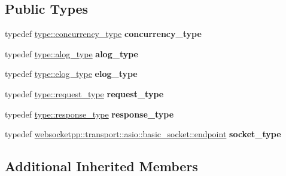 \subsection*{Public Types}
\begin{DoxyCompactItemize}
\item 
typedef \hyperlink{classwebsocketpp_1_1concurrency_1_1none}{type\+::concurrency\+\_\+type} {\bfseries concurrency\+\_\+type}\hypertarget{structconfig_1_1transport__config_a688f6afc4c2c3d28d4e753c2332e7fae}{}\label{structconfig_1_1transport__config_a688f6afc4c2c3d28d4e753c2332e7fae}

\item 
typedef \hyperlink{classwebsocketpp_1_1log_1_1stub}{type\+::alog\+\_\+type} {\bfseries alog\+\_\+type}\hypertarget{structconfig_1_1transport__config_a22470a78475a07398a2552060add0345}{}\label{structconfig_1_1transport__config_a22470a78475a07398a2552060add0345}

\item 
typedef \hyperlink{classwebsocketpp_1_1log_1_1stub}{type\+::elog\+\_\+type} {\bfseries elog\+\_\+type}\hypertarget{structconfig_1_1transport__config_a608fa7de7c01b30d2a4525a80be73509}{}\label{structconfig_1_1transport__config_a608fa7de7c01b30d2a4525a80be73509}

\item 
typedef \hyperlink{classwebsocketpp_1_1http_1_1parser_1_1request}{type\+::request\+\_\+type} {\bfseries request\+\_\+type}\hypertarget{structconfig_1_1transport__config_a6f30f84091e0b3ed0a2c458173558b93}{}\label{structconfig_1_1transport__config_a6f30f84091e0b3ed0a2c458173558b93}

\item 
typedef \hyperlink{classwebsocketpp_1_1http_1_1parser_1_1response}{type\+::response\+\_\+type} {\bfseries response\+\_\+type}\hypertarget{structconfig_1_1transport__config_a9c250a4f054f597bb7a11d6cd3424ac1}{}\label{structconfig_1_1transport__config_a9c250a4f054f597bb7a11d6cd3424ac1}

\item 
typedef \hyperlink{classwebsocketpp_1_1transport_1_1asio_1_1basic__socket_1_1endpoint}{websocketpp\+::transport\+::asio\+::basic\+\_\+socket\+::endpoint} {\bfseries socket\+\_\+type}\hypertarget{structconfig_1_1transport__config_ab3c546f6bc6184659f5b14004b17e856}{}\label{structconfig_1_1transport__config_ab3c546f6bc6184659f5b14004b17e856}

\end{DoxyCompactItemize}
\subsection*{Additional Inherited Members}


